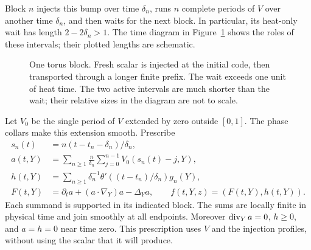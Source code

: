 Block $n$ injects this bump over time $\delta_n$, runs $n$ complete
periods of $V$ over another time $\delta_n$, and then waits for the
next block. In particular, its heat-only wait has length
$2-2\delta_n>1$. The time diagram in Figure~\ref{fig:blocks} shows the
roles of these intervals; their plotted lengths are schematic.

\begin{figure}[ht]
\centering
{}
\caption{One torus block. Fresh scalar is injected at the initial code,
then transported through a longer finite prefix. The wait exceeds one
unit of heat time. The two active intervals are much shorter than the
wait; their relative sizes in the diagram are not to scale.}
\label{fig:blocks}
\end{figure}

Let $V_0$ be the single period of $V$ extended by zero outside $[0,1]$.
The phase collars make this extension smooth. Prescribe
\begin{equation}\label{eq:compact-program}
 \begin{split}
 s_n(t)&=n(t-t_n-\delta_n)/\delta_n,\\
 a(t,Y)&=\sum_{n\ge1}\frac n{\delta_n}
                  \sum_{j=0}^{n-1}V_0(s_n(t)-j,Y),\\
 h(t,Y)&=\sum_{n\ge1}\delta_n^{-1}
           \theta'((t-t_n)/\delta_n)g_n(Y),\\
 F(t,Y)&=\partial_ta+(a\cdot\nabla_Y)a-\Delta_Ya,
 \qquad f(t,Y,z)=(F(t,Y),h(t,Y)).
 \end{split}
\end{equation}
Each summand is supported in its indicated block. The sums are locally
finite in physical time and join smoothly at all endpoints.
Moreover $\operatorname{div}_Ya=0$, $h\ge0$, and $a=h=0$ near time zero.
This prescription uses $V$ and the injection profiles, without using
the scalar that it will produce.

